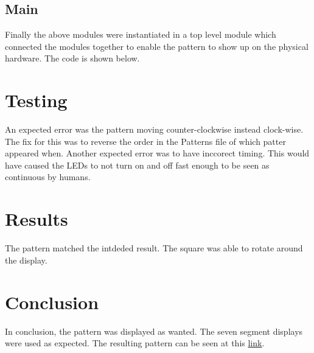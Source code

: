 \documentclass[12pt]{article}
\newcommand{\Verilog}[2][]{%
	
}
\begin{document}
\subsection{Main}
Finally the above modules were instantiated in a top level module which connected the modules together to enable the pattern to show up on the physical hardware. The code is shown below.
\Verilog[firstline=23]{./mysseg.srcs/sources_1/new/ssegmain.sv}

\section{Testing}
An expected error was the pattern moving counter-clockwise instead clock-wise. The fix for this was to reverse the order in the Patterns file of which patter appeared when.
Another expected error was to have inccorect timing. This would have caused the LEDs to not turn on and off fast enough to be seen as continuous by humans.


\section{Results}
The pattern matched the intdeded result. The square was able to rotate around the display.

\section{Conclusion}
In conclusion, the pattern was displayed as wanted. The seven segment displays were used as expected. The resulting pattern can be seen at this \href{https://www.youtube.com/watch?v=FZpEwH8YCFI}{link}.
\end{document}
